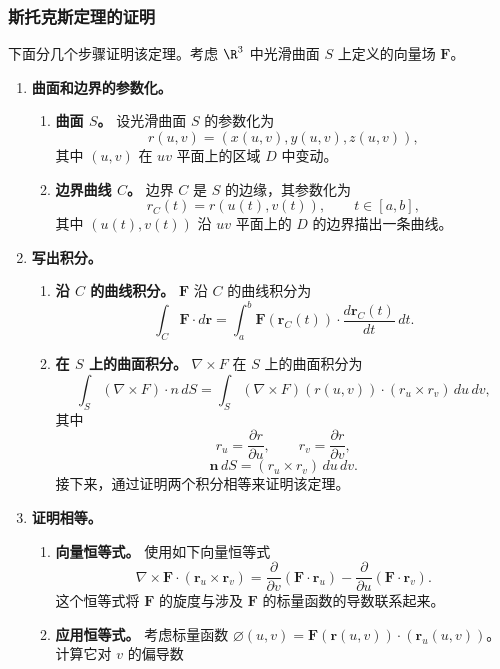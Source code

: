 \subsubsection{斯托克斯定理的证明}
下面分几个步骤证明该定理。考虑 $\R^3$ 中光滑曲面 $S$ 上定义的向量场 $\symbf{F}$。
\begin{enumerate}
\item \textbf{曲面和边界的参数化。}
\begin{enumerate}[label=\alph*.]
\item \textbf{曲面 $S$。}
设光滑曲面 $S$ 的参数化为
\[
  r(u,v)=(x(u,v),y(u,v),z(u,v)),
\]
其中 $(u,v)$ 在 $uv$ 平面上的区域 $D$ 中变动。
\item \textbf{边界曲线 $C$。}
边界 $C$ 是 $S$ 的边缘，其参数化为
\[
  r_C(t)=r(u(t),v(t)),\qquad t\in[a,b],
\]
其中 $(u(t),v(t))$ 沿 $uv$ 平面上的 $D$ 的边界描出一条曲线。
\end{enumerate}
\item \textbf{写出积分。}
\begin{enumerate}[label=\alph*.]
\item \textbf{沿 $C$ 的曲线积分。}
$\symbf{F}$ 沿 $C$ 的曲线积分为
\[
  \int_C\symbf{F}\cdot d\symbf{r}
    =\int_a^b\symbf{F}(\symbf{r}_C(t))\cdot\frac{d\symbf{r}_C(t)}{dt}\,dt.
\]
\item \textbf{在 $S$ 上的曲面积分。}
$\nabla\times F$ 在 $S$ 上的曲面积分为
\[
  \int_S(\nabla\times F)\cdot n\,dS
   =\int_S(\nabla\times F)(r(u,v))\cdot(r_u\times r_v)\,du\,dv,
\]
其中
\[
  r_u=\frac{\partial r}{\partial u},\qquad r_v=\frac{\partial r}{\partial v},
\]
\[
  \symbf{n}\,dS=(r_u\times r_v)\,du\,dv.
\]
接下来，通过证明两个积分相等来证明该定理。
\end{enumerate}
\item \textbf{证明相等。}
\begin{enumerate}[label=\alph*.]
\item \textbf{向量恒等式。}
使用如下向量恒等式%
%
\[
  \nabla\times\symbf{F}\cdot(\symbf{r}_u\times\symbf{r}_v)
   =\frac{\partial}{\partial v}(\symbf{F}\cdot\symbf{r}_u)
    -\frac{\partial}{\partial u}(\symbf{F}\cdot\symbf{r}_v).
\]
这个恒等式将 $\symbf{F}$ 的旋度与涉及 $\symbf{F}$ 的标量函数的导数联系起来。
\item \textbf{应用恒等式。}
考虑标量函数 $\varnothing(u,v)=\symbf{F}(\symbf{r}(u,v))\cdot(\symbf{r}_u(u,v))$。计算它对 $v$ 的偏导数

\end{enumerate}
\end{enumerate}
